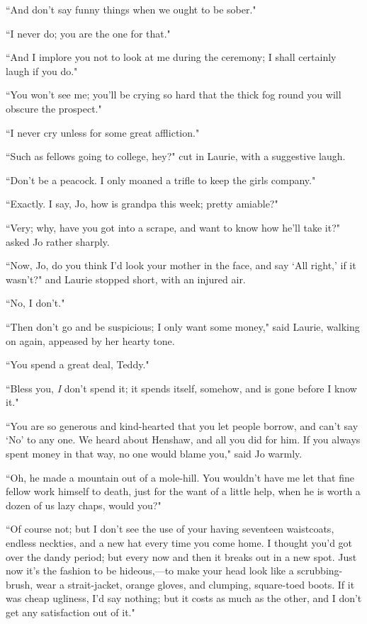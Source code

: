 ``And don't say funny things when we ought to be sober."

``I never do; you are the one for that."

``And I implore you not to look at me during the ceremony; I shall
certainly laugh if you do."

``You won't see me; you'll be crying so
hard that the thick fog round you will obscure the prospect."

``I never cry unless for some great affliction."

``Such as fellows going to college, hey?" cut in Laurie, with a
suggestive laugh.

``Don't be a peacock. I only moaned a trifle to keep the
girls company."

``Exactly. I say, Jo, how is grandpa this week; pretty amiable?"

``Very; why, have you got into a scrape, and want to know how
he'll take it?" asked Jo rather sharply.

``Now, Jo, do you think I'd look your mother in the face,
and say `All right,' if it
wasn't?" and Laurie stopped short, with an injured air.

``No, I don't."

``Then don't go and be suspicious; I only want some
money," said Laurie, walking on again, appeased by her hearty tone.

``You spend a great deal, Teddy."

``Bless you, \emph{I} don't spend it; it spends itself,
somehow, and is gone before I know it."

``You are so generous and kind-hearted that you let people borrow, and
can't say `No' to any
one. We heard about Henshaw, and all you did for him. If you always
spent money in that way, no one would blame you," said Jo warmly.

``Oh, he made a mountain out of a mole-hill. You wouldn't
have me let that fine fellow work himself to death, just for the want of
a little help, when he is worth a dozen of us lazy chaps, would you?"

``Of course not; but I don't see the use of your having
seventeen waistcoats, endless neckties, and a new hat every time you
come home. I thought you'd got over the dandy period;
but every now and then it breaks out in a new spot. Just now
it's the fashion to be hideous,---to make your head look
like a scrubbing-brush, wear a strait-jacket, orange gloves, and
clumping, square-toed boots. If it was cheap ugliness,
I'd say nothing; but it costs as much as the other, and
I don't get any satisfaction out of it."

